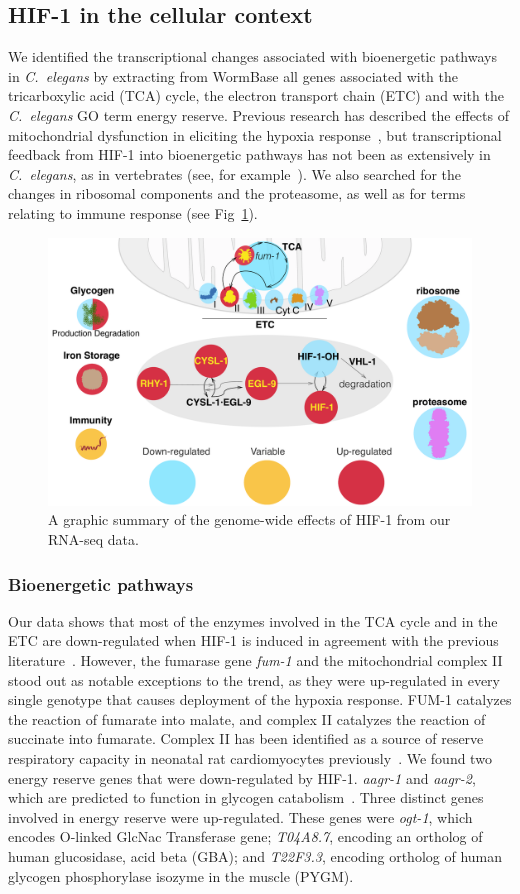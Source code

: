 \documentclass[10pt, onecolumn]{article}
\newcommand{\cel}{\emph{C.~elegans}}
\newcommand{\gene}[1]{\emph{#1}}
\newcommand{\hifp}{HIF-1}
\begin{document}
\subsection*{\hifp{} in the cellular context}
\label{sub:metabolism}

We identified the transcriptional changes
associated with bioenergetic pathways in \cel{} by extracting from
WormBase all genes associated with the tricarboxylic acid (TCA) cycle, the
electron transport chain (ETC) and with the \cel{} GO term energy reserve.
Previous research has described the effects of mitochondrial dysfunction in
eliciting the hypoxia response~\cite{Lee2010}, but transcriptional feedback
from \hifp{} into bioenergetic pathways has not been as extensively in \cel{},
as in vertebrates (see, for example~\cite{Semenza1994,Semenza2012}).
We also searched for the changes in ribosomal components and the proteasome, as
well as for terms relating to immune response (see Fig~\ref{fig:genomewide}).

\begin{figure}[tbhp]
\centering
\includegraphics[width=.7\linewidth]{../figs/hif1genomewide.pdf}
\caption{
A graphic summary of the genome-wide effects of \hifp{} from our RNA-seq data.
}
\label{fig:genomewide}
\end{figure}

\subsubsection*{Bioenergetic pathways}
Our data shows that most of the enzymes involved in the TCA cycle and in the ETC
are down-regulated when \hifp{} is induced in agreement with the previous
literature~\cite{Semenza2012}.
However, the fumarase gene \gene{fum-1} and the mitochondrial complex II stood out
as notable exceptions to the trend, as they were up-regulated in every single
genotype that causes deployment of the hypoxia response. FUM-1 catalyzes the
reaction of fumarate into malate, and complex II catalyzes the reaction of
succinate into fumarate. Complex II has been identified as a source of reserve
respiratory capacity in neonatal rat cardiomyocytes previously~\cite{Pfleger2015}.
We found two energy reserve genes that were down-regulated by \hifp{}.
\gene{aagr-1} and \gene{aagr-2}, which are predicted to function in glycogen
catabolism~\cite{Sikora2010}.
Three distinct genes involved in energy reserve were up-regulated. These genes were
\gene{ogt-1}, which encodes O-linked GlcNac Transferase gene; \gene{T04A8.7},
encoding an ortholog of human glucosidase, acid beta (GBA); and \gene{T22F3.3},
encoding ortholog of human glycogen phosphorylase isozyme in the muscle (PYGM).
\end{document}
